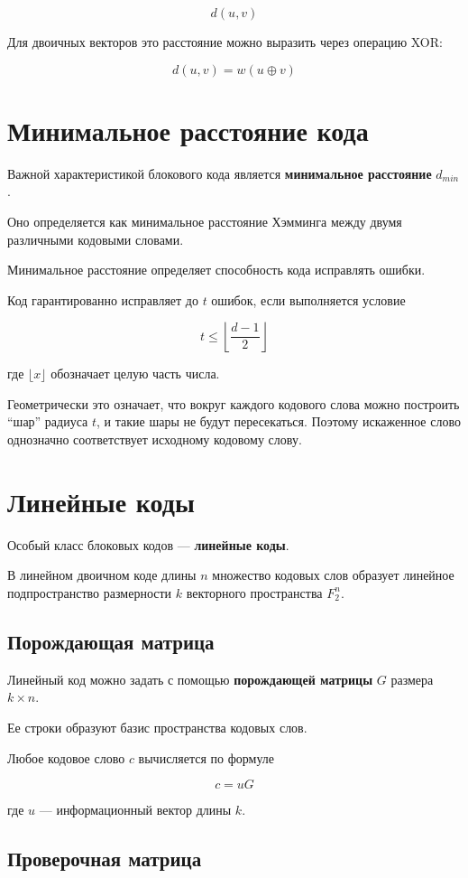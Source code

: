 \documentclass[a4paper,12pt]{article}
\begin{document}
\[
d(u,v)
\]

Для двоичных векторов это расстояние можно выразить через
операцию XOR:

\[
d(u,v) = w(u \oplus v)
\]

\section{Минимальное расстояние кода}

Важной характеристикой блокового кода является
\textbf{минимальное расстояние} $d_{min}$.

Оно определяется как минимальное расстояние Хэмминга
между двумя различными кодовыми словами.

Минимальное расстояние определяет способность кода
исправлять ошибки.

Код гарантированно исправляет до $t$ ошибок, если выполняется условие

\[
t \le \left\lfloor \frac{d-1}{2} \right\rfloor
\]

где $\lfloor x \rfloor$ обозначает целую часть числа.

Геометрически это означает, что вокруг каждого кодового слова
можно построить ``шар'' радиуса $t$, и такие шары не будут
пересекаться. Поэтому искаженное слово однозначно
соответствует исходному кодовому слову.

\section{Линейные коды}

Особый класс блоковых кодов — \textbf{линейные коды}.

В линейном двоичном коде длины $n$ множество кодовых слов
образует линейное подпространство размерности $k$
векторного пространства $F_2^n$.

\subsection{Порождающая матрица}

Линейный код можно задать с помощью
\textbf{порождающей матрицы} $G$ размера $k \times n$.

Ее строки образуют базис пространства кодовых слов.

Любое кодовое слово $c$ вычисляется по формуле

\[
c = uG
\]

где $u$ — информационный вектор длины $k$.

\subsection{Проверочная матрица}
\end{document}

